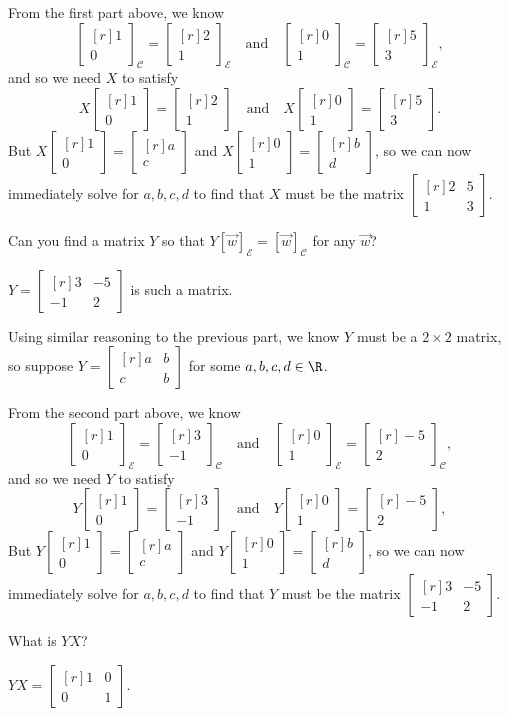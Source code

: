 \documentclass{problemset}
\newcommand{\mat}[1]{\begin{bmatrix*}[r]#1\end{bmatrix*}}
\begin{document}
\begin{parts}
\begin{solution}
				From the first part above, we know
				\[
					\mat{1\\0}_{\mathcal C} = \mat{2\\1}_{\mathcal E}
					\quad \text{and} \quad
					\mat{0\\1}_{\mathcal C} = \mat{5\\3}_{\mathcal E},
				\]
				and so we need $X$ to satisfy
				\[
					X\mat{1\\0}=\mat{2\\1}
					\quad \text{and} \quad
					X\mat{0\\1}=\mat{5\\3}.
				\]
				But $X\mat{1\\0}=\mat{a\\c}$ and $X\mat{0\\1}=\mat{b\\d}$, so we
				can now immediately solve for $a,b,c,d$ to find that $X$ must be
				the matrix $\mat{2&5\\1&3}$.
			\end{solution}
		\item Can you find a matrix $Y$ so that $Y[\vec w]_{\mathcal E} = [\vec w]_{\mathcal C}$
			for any	$\vec w$?
			\begin{solution}
				$Y = \mat{3&-5\\-1&2}$ is such a matrix. 

				Using similar reasoning to the previous part, we know $Y$ must be
				a $2\times2$ matrix, so suppose $Y=\mat{a&b\\c&b}$ for some 
				$a,b,c,d\in\R$. 

				From the second part above, we know
				\[
					\mat{1\\0}_{\mathcal E} = \mat{3\\-1}_{\mathcal C}
					\quad \text{and} \quad
					\mat{0\\1}_{\mathcal E} = \mat{-5\\2}_{\mathcal C},
				\]
				and so we need $Y$ to satisfy
				\[
					Y\mat{1\\0}=\mat{3\\-1}
					\quad \text{and} \quad
					Y\mat{0\\1}=\mat{-5\\2},
				\]
				But $Y\mat{1\\0}=\mat{a\\c}$ and $Y\mat{0\\1}=\mat{b\\d}$, so we
				can now immediately solve for $a,b,c,d$ to find that $Y$ must be
				the matrix $\mat{3&-5\\-1&2}$.
			\end{solution}
		\item What is $YX$?
			\begin{solution}
				$YX = \mat{1&0\\0&1}$.
			\end{solution}
	\end{parts}
\end{document}
